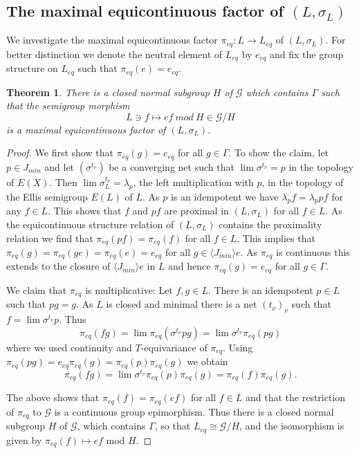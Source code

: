\documentclass[10pt,a4paper]{amsart}
\newtheorem{theorem}{Theorem}[section]
\numberwithin{equation}{section}
\newcommand{\Gg}{{\mathcal G}}
\newcommand{\pe}{\pi_{eq}}
\begin{document}
\newcommand{\ol}{e_{eq}}

\subsection{The maximal equicontinuous factor of $(L,\sigma_L)$}
We investigate the maximal equicontinuous factor $\pe:L\to L_{eq}$ of $(L,\sigma_L)$. For better distinction we denote the neutral element of $L_{eq}$ by $\ol$ and fix the group structure on $L_{eq}$ such that $\pe(e)=\ol$. 
\begin{theorem}\label{thm:mef}  There is a closed normal subgroup $H$ of $\Gg$ which contains $\Gamma$ such that the semigroup morphism
$$L\ni f \mapsto ef\:mod\:H \in \Gg/H$$
is a maximal equicontinuous factor of $(L,\sigma_L)$.
\end{theorem} 
\begin{proof}
We first show that $\pe(g)=\ol$ for all $g\in \Gamma$. 
To show the claim, let $p\in J_{min}$ and let $(\sigma^{t_\nu})$ be a converging net such that $\lim {\sigma^{t_\nu}} = p$ in the topology of $E(X)$. 
Then $\lim {\sigma_L^{t_\nu}} = \lambda_p$, the left multiplication with $p$, in the topology of the Ellis semigroup $E(L)$ of $L$. As $p$ is an idempotent we have $\lambda_p f = \lambda_p pf$ for any $f\in L$. This shows that $f$ and $pf$ are proximal in $(L,\sigma_L)$ for all $f\in L$.
 As the equicontinuous structure relation of $(L,\sigma_L)$ contains the proximality relation \cite{Auslander1988} we find that $\pe(pf) = \pe(f)$ for  all $f\in L$. This implies that $\pe(g) = \pe(ge) = \pe(e) = \ol$ for all $g\in \langle J_{min} \rangle e$.
As $\pe$ is continuous this extends to the closure of $\langle J_{min} \rangle e$ in $L$ and hence $\pe(g) = \ol$ for all $g\in \Gamma$.

We claim that $\pe$ is multiplicative: Let $f,g\in L$. There is an idempotent $p\in L$ such that $pg=g$. As $L$ is closed and minimal there is a net $(t_\nu)_\nu$ such that $f=\lim \sigma^{t_\nu}p$. Thus
$$\pe(fg) =  \lim \pe(\sigma^{t_\nu} p g) =  \lim \sigma^{t_\nu} \pe(p g)$$
where we used continuity and $T$-equivariance of $\pe$.
Using $ \pe(p g) = \ol \pe(g) = \pe(p)\pe(g)$ we obtain
$$\pe(fg) =\lim \sigma^{t_\nu} \pe(p) \pe(g) = \pe(f)\pe(g). 
$$

The above shows that $\pe(f) = \pe(ef)$ for all $f\in L$ and that 
the restriction of $\pe$ to $\Gg$ is a continuous group epimorphism. 
 Thus there is a closed normal subgroup $H$ of $\Gg$, which contains $\Gamma$, so that $L_{eq} \cong\Gg/H$, and the isomorphism is given by $\pe(f) \mapsto ef$ mod $H$. 
\end{proof}
\end{document}
